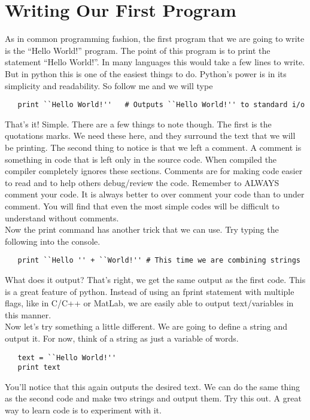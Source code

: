 \documentclass[11pt]{article}   %
\begin{document}
\section*{Writing Our First Program}
As in common programming fashion, the first program that we are going to write is the ``Hello World!'' program.  The point of this program is to print the statement ``Hello World!''.
In many languages this would take a few lines to write.  But in python this is one of the easiest things to do.  Python's power is in its simplicity and readability.  So follow me and 
we will type
\begin{tcolorbox}
   \begin{lstlisting}
   print ``Hello World!''   # Outputs ``Hello World!'' to standard i/o
   \end{lstlisting}
\end{tcolorbox}
That's it!  Simple.  There are a few things to note though.  The first is the quotations marks.  We need these here, and they surround the text that we will be printing.  The second thing
to notice is that we left a comment.  A comment is something in code that is left only in the source code.  When compiled the compiler completely ignores these sections.  Comments are for
making code easier to read and to help others debug/review the code.  Remember to ALWAYS comment your code.  It is always better to over comment your code than to under comment.
You will find that even the most simple codes will be difficult to understand without comments.  
\\
Now the print command has another trick that we can use.  Try typing the following into the console.
\begin{tcolorbox}
   \begin{lstlisting}
   print ``Hello '' + ``World!'' # This time we are combining strings
   \end{lstlisting}
\end{tcolorbox}
What does it output?  That's right, we get the same output as the first code.  This is a great feature of python.  Instead of using an fprint statement with multiple flags, like in C/C++ or
MatLab, we are easily able to output text/variables in this manner.
\\
Now let's try something a little different.  We are going to define a string and output it.  For now, think of a string as just a variable of words.\\
\begin{tcolorbox}
   \begin{lstlisting}
   text = ``Hello World!''
   print text
   \end{lstlisting}
\end{tcolorbox}
You'll notice that this again outputs the desired text.  We can do the same thing as the second code and make two strings and output them.  Try this out.  A great way to learn code is to
experiment with it.  
\end{document}
